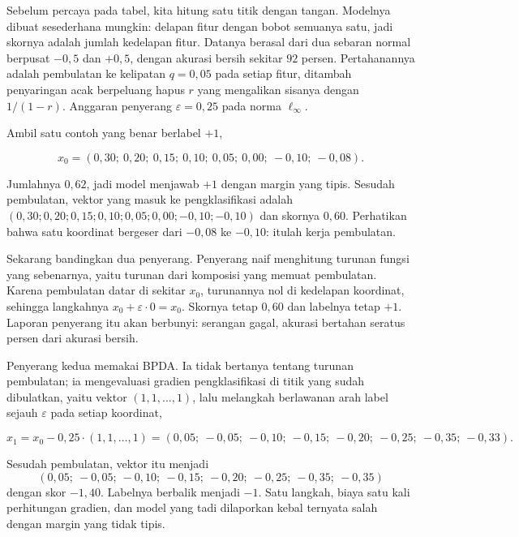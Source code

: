 Sebelum percaya pada tabel, kita hitung satu titik dengan tangan. Modelnya dibuat
sesederhana mungkin: delapan fitur dengan bobot semuanya satu, jadi skornya adalah
jumlah kedelapan fitur. Datanya berasal dari dua sebaran normal berpusat $-0{,}5$ dan
$+0{,}5$, dengan akurasi bersih sekitar $92$ persen. Pertahanannya adalah pembulatan ke
kelipatan $q=0{,}05$ pada setiap fitur, ditambah penyaringan acak berpeluang hapus $r$
yang mengalikan sisanya dengan $1/(1-r)$. Anggaran penyerang $\varepsilon=0{,}25$ pada
norma $\ell_\infty$.

Ambil satu contoh yang benar berlabel $+1$,

\begin{equation}
x_0 = (0{,}30;\ 0{,}20;\ 0{,}15;\ 0{,}10;\ 0{,}05;\ 0{,}00;\ -0{,}10;\ -0{,}08).
\end{equation}

Jumlahnya $0{,}62$, jadi model menjawab $+1$ dengan margin yang tipis. Sesudah
pembulatan, vektor yang masuk ke pengklasifikasi adalah
$(0{,}30;0{,}20;0{,}15;0{,}10;0{,}05;0{,}00;-0{,}10;-0{,}10)$ dan skornya $0{,}60$.
Perhatikan bahwa satu koordinat bergeser dari $-0{,}08$ ke $-0{,}10$: itulah kerja
pembulatan.

Sekarang bandingkan dua penyerang. Penyerang naif menghitung turunan fungsi yang
sebenarnya, yaitu turunan dari komposisi yang memuat pembulatan. Karena pembulatan
datar di sekitar $x_0$, turunannya nol di kedelapan koordinat, sehingga langkahnya
$x_0 + \varepsilon\cdot 0 = x_0$. Skornya tetap $0{,}60$ dan labelnya tetap $+1$.
Laporan penyerang itu akan berbunyi: serangan gagal, akurasi bertahan seratus persen
dari akurasi bersih.

Penyerang kedua memakai BPDA. Ia tidak bertanya tentang turunan pembulatan; ia
mengevaluasi gradien pengklasifikasi di titik yang sudah dibulatkan, yaitu vektor
$(1,1,\dots,1)$, lalu melangkah berlawanan arah label sejauh $\varepsilon$ pada setiap
koordinat,

\begin{equation}
x_1 = x_0 - 0{,}25\cdot(1,1,\dots,1)
= (0{,}05;\ -0{,}05;\ -0{,}10;\ -0{,}15;\ -0{,}20;\ -0{,}25;\ -0{,}35;\ -0{,}33).
\end{equation}

Sesudah pembulatan, vektor itu menjadi
\[
(0{,}05;\ -0{,}05;\ -0{,}10;\ -0{,}15;\ -0{,}20;\ -0{,}25;\ -0{,}35;\ -0{,}35)
\]
dengan skor $-1{,}40$. Labelnya berbalik menjadi $-1$. Satu langkah, biaya satu kali
perhitungan gradien, dan model yang tadi dilaporkan kebal ternyata salah dengan margin
yang tidak tipis.

